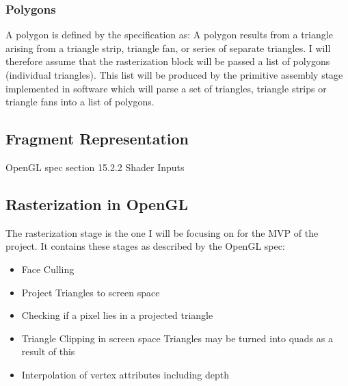 \subsubsection{Polygons}
A polygon is defined by the specification as: A polygon results from a triangle arising from a triangle strip, triangle fan, or series of separate triangles.
I will therefore assume that the rasterization block will be passed a list of polygons (individual triangles). This list will be produced by the primitive assembly stage implemented in software which will parse a set of triangles, triangle strips or triangle fans into a list of polygons.

\subsection{Fragment Representation}
OpenGL spec section 15.2.2 Shader Inputs

\subsection{Rasterization in OpenGL}\label{sec:rasterOpenGL}

The rasterization stage is the one I will be focusing on for the MVP of the project. It contains these stages as described by the OpenGL spec:

\begin{itemize}
    \item Face Culling
    \item Project Triangles to screen space
    \item Checking if a pixel lies in a projected triangle
    \item Triangle Clipping in screen space
    \subitem Triangles may be turned into quads as a result of this
    \item Interpolation of vertex attributes including depth
\end{itemize}

